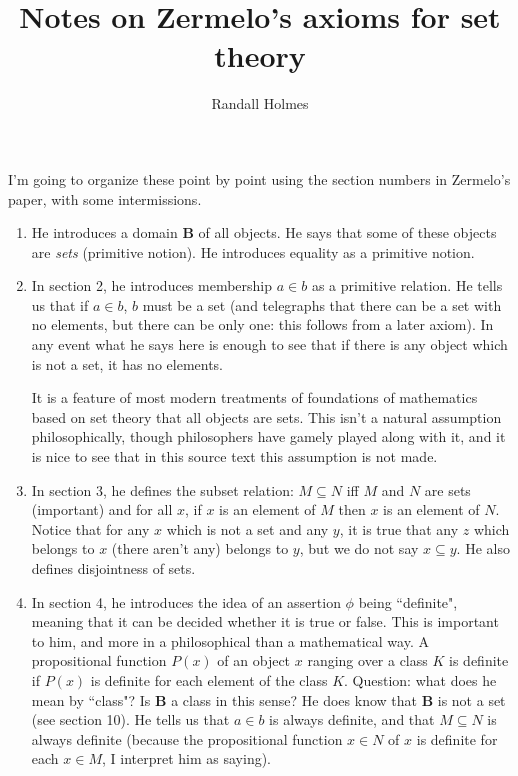\documentclass[12pt]{article}
\title{Notes on Zermelo's axioms for set theory}
\author{Randall Holmes}
\begin{document}
\maketitle

I'm going to organize these point by point using the section numbers in Zermelo's paper, with some intermissions.

\begin{enumerate}

\item  He introduces a domain {\bf B} of all objects.  He says that some of these objects are {\em sets\/} (primitive notion).  He introduces equality as a primitive notion.

\item  In section 2, he introduces membership $a \in b$ as a primitive relation.  He tells us that if $a \in b$, $b$ must be a set (and telegraphs that there can be a set with no elements, but there can be only one:  this follows from a later axiom).  In any event what he says here is enough to see that if there is any object which is not a set, it has no elements.

It is a feature of most modern treatments of foundations of mathematics based on set theory that all objects are sets.  This isn't a natural assumption philosophically, though philosophers have gamely played along with it, and it is nice to see that in this source text this assumption is not made.

\item In section 3, he defines the subset relation:  $M \subseteq N$ iff $M$ and $N$ are sets (important) and for all $x$, if $x$ is an element of $M$ then $x$ is an element of $N$.  Notice that for any $x$ which is not a set and any $y$, it is true that any $z$ which belongs to $x$ (there aren't any) belongs to $y$, but we do not say $x \subseteq y$.  He also defines disjointness of sets.

\item In section 4, he introduces the idea of an assertion $\phi$ being ``definite", meaning that it can be decided whether it is true or false.  This is important to him, and more in a philosophical than a mathematical way.  A propositional function $P(x)$ of an object $x$ ranging over a class $K$ is definite if $P(x)$ is definite for each element of the class $K$.  Question:  what does he mean by ``class"?  Is {\bf B} a class in this sense?  He does know that {\bf B} is not a set (see section 10).  He tells us that $a \in b$ is always definite, and that $M \subseteq N$ is always definite
(because the propositional function $x \in N$ of $x$ is definite for each $x \in M$, I interpret him as saying).


\end{enumerate}
\end{document}
